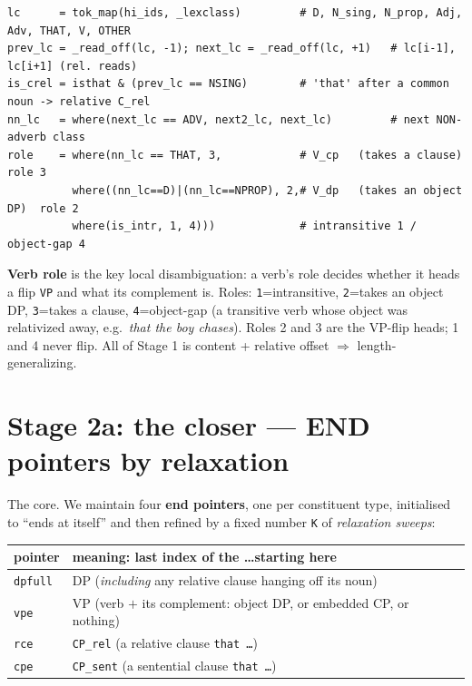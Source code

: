\documentclass[11pt]{article}
\newcommand{\flip}[1]{\textcolor{flipc}{#1}}
\newcommand{\code}[1]{\texttt{#1}}
\begin{document}
\begin{lstlisting}
lc      = tok_map(hi_ids, _lexclass)         # D, N_sing, N_prop, Adj, Adv, THAT, V, OTHER
prev_lc = _read_off(lc, -1); next_lc = _read_off(lc, +1)   # lc[i-1], lc[i+1] (rel. reads)
is_crel = isthat & (prev_lc == NSING)        # 'that' after a common noun -> relative C_rel
nn_lc   = where(next_lc == ADV, next2_lc, next_lc)         # next NON-adverb class
role    = where(nn_lc == THAT, 3,            # V_cp   (takes a clause)      role 3
          where((nn_lc==D)|(nn_lc==NPROP), 2,# V_dp   (takes an object DP)  role 2
          where(is_intr, 1, 4)))             # intransitive 1 / object-gap 4
\end{lstlisting}

\noindent \textbf{Verb role} is the key local disambiguation: a verb's role decides whether it heads
a \flip{flip} \code{VP} and what its complement is. Roles: \code{1}=intransitive, \code{2}=takes an
object DP, \code{3}=takes a clause, \code{4}=object-gap (a transitive verb whose object was
relativized away, e.g.\ \emph{that the boy chases}). Roles 2 and 3 are the VP-flip heads; 1 and 4
never flip. All of Stage 1 is content + relative offset $\Rightarrow$ length-generalizing.

\section{Stage 2a: the \flip{closer} --- END pointers by relaxation}

The core. We maintain four \textbf{end pointers}, one per constituent type, initialised to
``ends at itself'' and then refined by a fixed number \code{K} of \emph{relaxation sweeps}:

\begin{center}\footnotesize
\begin{tabular}{@{}ll@{}}
\toprule
pointer & meaning: last index of the \dots starting here\\
\midrule
\code{dpfull} & DP (\emph{including} any relative clause hanging off its noun)\\
\code{vpe}    & VP (verb $+$ its complement: object DP, or embedded CP, or nothing)\\
\code{rce}    & \code{CP\_rel} (a relative clause \code{that \dots})\\
\code{cpe}    & \code{CP\_sent} (a sentential clause \code{that \dots})\\
\bottomrule
\end{tabular}
\end{center}
\end{document}
